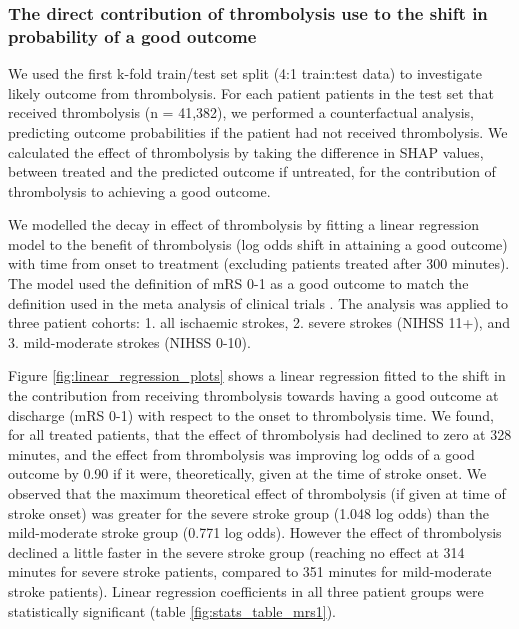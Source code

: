 

\subsubsection{The direct contribution of thrombolysis use to the shift in probability of a good outcome}

We used the first k-fold train/test set split (4:1 train:test data) to investigate likely outcome from thrombolysis. For each patient patients in the test set that received thrombolysis (n = 41,382), we performed a counterfactual analysis, predicting outcome probabilities if the patient had not received thrombolysis. We calculated the effect of thrombolysis by taking the difference in SHAP values, between treated and the predicted outcome if untreated, for the contribution of thrombolysis to achieving a good outcome.

We modelled the decay in effect of thrombolysis by fitting a linear regression model to the benefit of thrombolysis (log odds shift in attaining a good outcome) with time from onset to treatment (excluding patients treated after 300 minutes). The model used the definition of mRS 0-1 as a good outcome to match the definition used in the meta analysis of clinical trials \cite{emberson_effect_2014}. The analysis was applied to three patient cohorts: 1. all ischaemic strokes, 2. severe strokes (NIHSS 11+), and 3. mild-moderate strokes (NIHSS 0-10). 

Figure \ref{fig:linear_regression_plots} shows a linear regression fitted to the shift in the contribution from receiving thrombolysis towards having a good outcome at discharge (mRS 0-1) with respect to the onset to thrombolysis time. We found, for all treated patients, that the effect of thrombolysis had declined to zero at 328 minutes, and the effect from thrombolysis was improving log odds of a good outcome by 0.90 if it were, theoretically, given at the time of stroke onset. We observed that the maximum theoretical effect of thrombolysis (if given at time of stroke onset) was greater for the severe stroke group (1.048 log odds) than the mild-moderate stroke group (0.771 log odds). However the effect of thrombolysis declined a little faster in the severe stroke group (reaching no effect at 314 minutes for severe stroke patients, compared to 351 minutes for mild-moderate stroke patients). Linear regression coefficients in all three patient groups were statistically significant (table \ref{fig:stats_table_mrs1}). 

